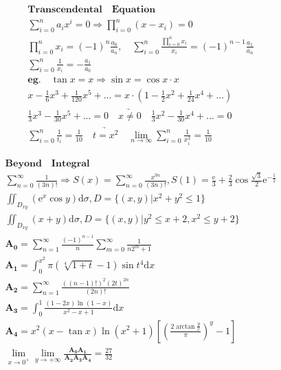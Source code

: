 \documentclass{article}
\begin{document}
\clearpage

\begin{align*}
    \bm{Transcendental \quad Equation} \\ 
    \sum_{i=0}^{n}a_{i}x^i = 0 \Longrightarrow \prod_{i=0}^{n}(x-x_{i})=0 \\ 
    \prod_{i=0}^{n}x_{i} = (-1)^{n}\frac{a_{0}}{a_{n}},\quad \sum_{i=0}^{n}\frac{\prod_{i=0}^{n}x_{i}}{x_{i}} = (-1)^{n-1}\frac{a_{1}}{a_{n}} \\ 
    \sum_{i=0}^{n}\frac{1}{x_{i}} = -\frac{a_{1}}{a_{0}} \\ 
    \bm{eg.} \quad \tan x = x \Longrightarrow \sin{x} = \cos{x} \cdot x \\
    x - \frac{1}{6}x^3 + \frac{1}{120}x^5 +... = x \cdot (1-\frac{1}{2}x^2+\frac{1}{24}x^4+...) \\
    \frac{1}{3}x^3-\frac{1}{30}x^5+... = 0 \quad \underrightarrow{x \not= 0} \quad \frac{1}{3}x^2-\frac{1}{30}x^4+... = 0 \\
    \sum_{i=0}^{n}\frac{1}{t_{i}} = \frac{1}{10} \quad \underrightarrow{t = x^2} \quad \lim_{n \to \infty}\sum_{i=0}^{n}\frac{1}{x_{i}^2} = \frac{1}{10} 
\end{align*}

\clearpage

\begin{align*}
    \bm{Beyond \quad Integral} \\
    \sum_{n=0}^\infty \frac{1}{(3n)!} \Longrightarrow S(x) = \sum_{n=0}^{\infty}{\frac{x^{3n}}{(3n)!}} ,S(1) = \frac{\mathrm{e}}{3}+\frac{2}{3}\cos\frac{\sqrt{3}}{2}\mathrm{e}^{-\frac{1}{2}}\\ 
    \iint_{D_{xy}}(\mathrm{e}^{x}\cos y)\mathrm{d}\sigma, D=\{(x,y)|x^2+y^2 \le 1\} \\ 
    \iint_{D_{xy}} (x+y)\mathrm{d}\sigma , D=\{(x,y)|y^2 \le x+2, x^2 \le y+2\} \\
    \bm{A_{0}} = \sum_{n=1}^\infty\frac{(-1)^{n-1}}{n}\sum_{m=0}^\infty\frac{1}{n2^m+1} \\
    \bm{A_{1}} = \int_{0}^{x^2} \pi(\sqrt[4]{1+t}-1)\sin t^4 \mathrm{d}x\\ 
    \bm{A_{2}} = \sum_{n=1}^\infty \frac{((n-1)!)^2(2t)^{2n}}{(2n)!} \\
    \bm{A_{3}} = \int_{0}^1\frac{(1-2x)\ln(1-x)}{x^2-x+1}\mathrm{d}x\\
    \bm{A_{4}} = x^2(x-\tan x)\ln(x^2+1)[\left(\frac{2\arctan \frac{y}{x}}{\pi}\right)^y-1] \\ 
    \lim_{x \to 0^{+}} \lim_{y \to +\infty}\frac{\bm{A_{0}}\bm{A_{1}}}{\bm{A_{2}}\bm{A_{3}}\bm{A_{4}}} = \frac{27}{32}\\
\end{align*}
\end{document}
